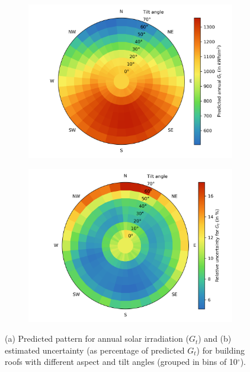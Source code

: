 \begin{figure}[htb]
\centering
\begin{subfigure}{.49\textwidth}
  \centering
  \includegraphics[width=\linewidth]{images/Figs/prediction_tilt_aspect.png}
  \subcaption{}
  \label{fig:chile_tiltIrrad}
\end{subfigure}
\begin{subfigure}{.49\textwidth}
  \centering
  \includegraphics[width=\linewidth]{images/Figs/total_std_perc_tilt_aspect.png}  
  \subcaption{}
  \label{fig:chile_unc}
\end{subfigure}
\caption{(a) Predicted pattern for annual solar irradiation ($G_t$) and (b) estimated uncertainty (as percentage of predicted $G_t$) for building roofs with different aspect and tilt angles (grouped in bins of 10$^\circ$).}
\end{figure}

